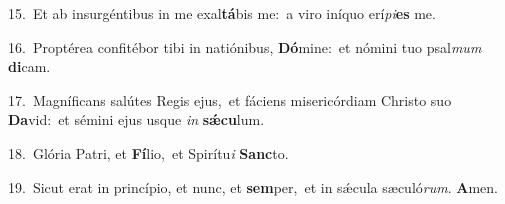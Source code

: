 {\numbfont\textcolor{\numbcolor}{15.}}~Et ab insurgéntibus in me exal\-\textbf{tá}\-bis me:~\star a viro iníquo erí\-\textit{pi}\-\textbf{es} me.\par
{\numbfont\textcolor{\numbcolor}{16.}}~Proptérea confitébor tibi in natiónibus, \textbf{Dó}\-mine:~\star et nómini tuo psal\textit{mum} \textbf{di}\-cam.\par
{\numbfont\textcolor{\numbcolor}{17.}}~Magníficans salútes Regis ejus,~\dagger et fáciens misericórdiam Christo suo \textbf{Da}\-vid:~\star et sémini ejus usque \textit{in} \textbf{sǽ}\-\textbf{cu}lum.\par
{\numbfont\textcolor{\numbcolor}{18.}}~Glória Patri, et \textbf{Fí}\-lio,~\star et Spirítu\textit{i} \textbf{Sanc}\-to.\par
{\numbfont\textcolor{\numbcolor}{19.}}~Sicut erat in princípio, et nunc, et \textbf{sem}\-per,~\star et in sǽcula sæculó\-\textit{rum}\-. \textbf{A}\-men.\par
